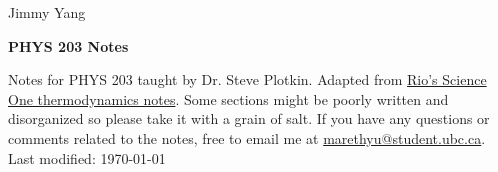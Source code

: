 \documentclass[12pt, a4paper]{article}
\newcommand{\doctitle}{PHYS 203 Notes}
\newcommand{\name}{Jimmy Yang}
\begin{document}
\begin{flushright}
\name
\end{flushright}

\begin{center}
\Large
\bfseries
\doctitle
\end{center}

\thispagestyle{plain}

\begin{center}
Notes for PHYS 203 taught by Dr. Steve Plotkin. Adapted from \href{https://github.com/RioWeil/SCIE001-thermo-notes}{Rio's Science One thermodynamics notes}. Some sections might be poorly written and disorganized so please take it with a grain of salt. If you have any questions or comments related to the notes, free to email me at \href{mailto:marethyu@student.ubc.ca}{marethyu@student.ubc.ca}. \\
Last modified: \today
\end{center}

\tableofcontents
\newpage

\newpage

\newpage

\end{document}
